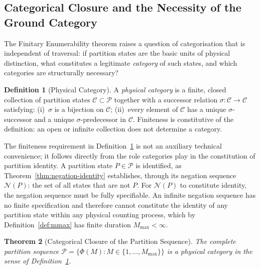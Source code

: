 \documentclass[twocolumn,10pt,a4paper]{article}
\theoremstyle{thmstyle}
\newtheorem{theorem}{Theorem}[section]
\theoremstyle{definition}
\newtheorem{definition}[theorem]{Definition}
\theoremstyle{remark}
\newcommand{\Parts}{\mathcal{P}}
\newcommand{\Mmax}{M_{\max}}
\newcommand{\PhiMap}{\varPhi}
\begin{document}
\subsection{Categorical Closure and the Necessity of the Ground Category}
\label{sec:cat-closure}

The Finitary Enumerability theorem raises a question of categorisation that is independent of traversal: if partition states are the basic units of physical distinction, what constitutes a legitimate \emph{category} of such states, and which categories are structurally necessary?

\begin{definition}[Physical Category]
\label{def:category}
A \emph{physical category} is a finite, closed collection of partition states $\mathcal{C} \subset \Parts$ together with a successor relation $\sigma\colon \mathcal{C} \to \mathcal{C}$ satisfying: (i)~$\sigma$ is a bijection on $\mathcal{C}$; (ii)~every element of $\mathcal{C}$ has a unique $\sigma$-successor and a unique $\sigma$-predecessor in $\mathcal{C}$. Finiteness is constitutive of the definition: an open or infinite collection does not determine a category.
\end{definition}

The finiteness requirement in Definition~\ref{def:category} is not an auxiliary technical convenience; it follows directly from the role categories play in the constitution of partition identity. A partition state $P \in \Parts$ is identified, as Theorem~\ref{thm:negation-identity} establishes, through its negation sequence $\mathcal{N}(P)$: the set of all states that are not $P$. For $\mathcal{N}(P)$ to constitute identity, the negation sequence must be fully specifiable. An infinite negation sequence has no finite specification and therefore cannot constitute the identity of any partition state within any physical counting process, which by Definition~\ref{def:mmax} has finite duration $\Mmax < \infty$.

\begin{theorem}[Categorical Closure of the Partition Sequence]
\label{thm:cat-closure}
The complete partition sequence $\Parts = \{ \PhiMap(M) : M \in \{1, \ldots, \Mmax\} \}$ is a physical category in the sense of Definition~\ref{def:category}.
\end{theorem}
\end{document}

